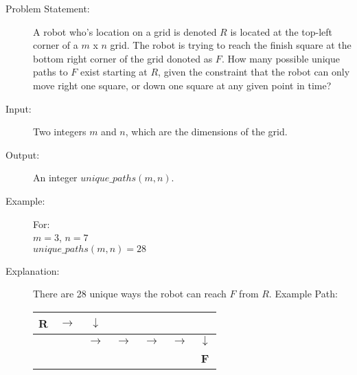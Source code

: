 \begin{description}
    \item[Problem Statement:]
        A robot who's location on a grid is denoted $R$ is located at the top-left corner of a $m$ x $n$ grid.
        The robot is trying to reach the finish square at the bottom right corner of the grid donoted as $F$.
        How many possible unique paths to $F$ exist starting at $R$, given the constraint that the robot can only move right one square, or down one square at any given point in time?
        
    \item[Input:]
        Two integers $m$ and $n$, which are the dimensions of the grid.
        
    \item[Output:] 
        An integer $unique\_paths(m,n)$.
        
    \item[Example:] For:\\
        $m = 3$, $n = 7$\\
        $unique\_paths(m,n) = 28$
        
    \item[Explanation:]
        There are 28 unique ways the robot can reach $F$ from $R$.
        Example Path:

        \begin{table}[htbp]
            \centering
            \begin{tabular}{|c|c|c|c|c|c|c|}
                \hline
                \textbf{R} & $\rightarrow$ & $\downarrow$ &  &  &  &  \\
                \hline
                 &  & $\rightarrow$ & $\rightarrow$ & $\rightarrow$ & $\rightarrow$ & $\downarrow$ \\
                \hline
                 &  &  &  &  &  & \textbf{F} \\
                \hline
            \end{tabular}
        \end{table}

        
\end{description}

